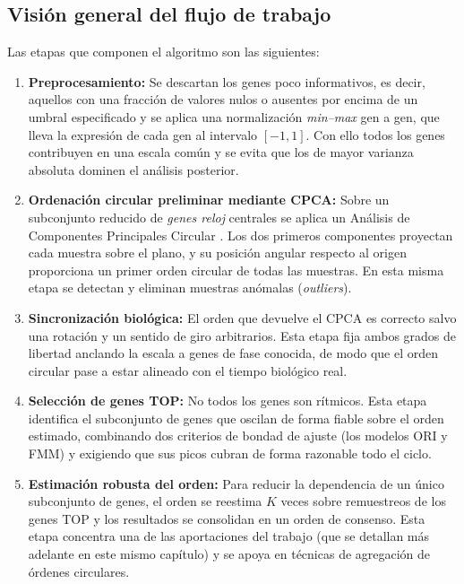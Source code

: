 \documentclass[12pt, a4paper]{report}
\begin{document}
\subsection{Visión general del flujo de trabajo}
\label{subsec:flujo}

Las etapas que componen el algoritmo son las siguientes:

\begin{enumerate}
    \item \textbf{Preprocesamiento:} Se descartan los genes poco informativos, es decir, aquellos con una fracción de valores nulos o ausentes por encima de un umbral especificado y se aplica una normalización \textit{min--max} gen a gen, que lleva la expresión de cada gen al intervalo $[-1,1]$. Con ello todos los genes contribuyen en una escala común y se evita que los de mayor varianza absoluta dominen el análisis posterior.

    \item \textbf{Ordenación circular preliminar mediante CPCA:} Sobre un subconjunto reducido de \emph{genes reloj} centrales se aplica un Análisis de Componentes Principales Circular \cite{scholz2007}. Los dos primeros componentes proyectan cada muestra sobre el plano, y su posición angular respecto al origen proporciona un primer orden circular de todas las muestras. En esta misma etapa se detectan y eliminan muestras anómalas (\textit{outliers}).

    \item \textbf{Sincronización biológica:} El orden que devuelve el CPCA es correcto salvo una rotación y un sentido de giro arbitrarios. Esta etapa fija ambos grados de libertad anclando la escala a genes de fase conocida, de modo que el orden circular pase a estar alineado con el tiempo biológico real.

    \item \textbf{Selección de genes TOP:} No todos los genes son rítmicos. Esta etapa identifica el subconjunto de genes que oscilan de forma fiable sobre el orden estimado, combinando dos criterios de bondad de ajuste (los modelos ORI y FMM) y exigiendo que sus picos cubran de forma razonable todo el ciclo.

    \item \textbf{Estimación robusta del orden:} Para reducir la dependencia de un único subconjunto de genes, el orden se reestima $K$ veces sobre remuestreos de los genes TOP y los resultados se consolidan en un orden de consenso. Esta etapa concentra una de las aportaciones del trabajo (que se detallan más adelante en este mismo capítulo) y se apoya en técnicas de agregación de órdenes circulares.
\end{enumerate}
\end{document}
